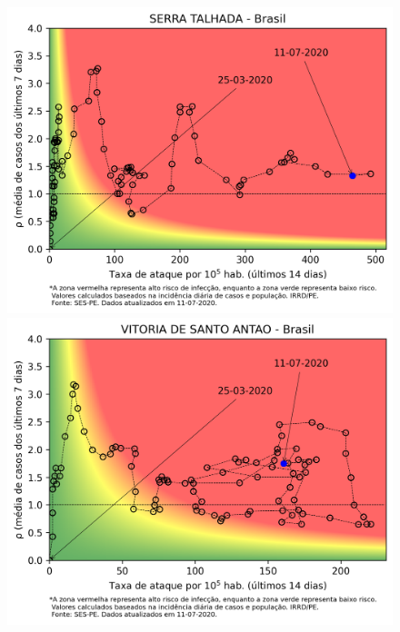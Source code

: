 \documentclass[]{article}
\begin{document}
\begin{figure}[!h]
	\begin{minipage}[t]{4cm}
		\centering
		\includegraphics[scale=0.5]{../SERRA TALHADA.png}
	\end{minipage}
	\hspace{5cm}
	\begin{minipage}[t]{4cm}
		\centering
		\includegraphics[scale=0.5]{../VITORIA DE SANTO ANTAO.png}
		\vspace{0.2cm}
	\end{minipage}


\end{figure}
\end{document}
